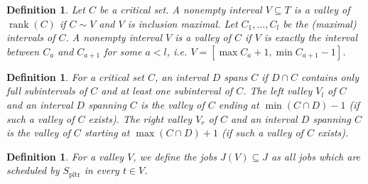 \documentclass[a4paper]{article}
\DeclareMathOperator{\pltr}{pltr}
\DeclareMathOperator{\rank}{rank}
\newtheorem{definition}[theorem]{Definition}
\begin{document}
\begin{definition}
  Let $C$ be a critical set. A nonempty interval $V \subseteq T$ is a \emph{valley of $\rank(C)$} if $C \sim V$ and $V$ is inclusion maximal.
  Let $C_1, \ldots, C_l$ be the (maximal) intervals of $C$.
  A nonempty interval $V$ is a \emph{valley of $C$} if $V$ is exactly the interval between $C_{a}$ and $C_{a+1}$ for some $a < l$, i.e. $V = [\max C_a + 1, \min C_{a+1} - 1]$.
\end{definition}
\begin{definition}
  For a critical set $C$, an interval $D$ \emph{spans} $C$ if $D \cap C$ contains only full subintervals of $C$ and at least one subinterval of $C$.
  The \emph{left valley} $V_l$ of $C$ and an interval $D$ spanning $C$ is the valley of $C$ ending at $\min (C \cap D) - 1$ (if such a valley of $C$ exists).
  The \emph{right valley} $V_r$ of $C$ and an interval $D$ spanning $C$ is the valley of $C$ starting at $\max (C \cap D) + 1$ (if such a valley of $C$ exists).
\end{definition}

\begin{definition}
  For a valley $V$, we define the jobs $J(V) \subseteq J$ as all jobs which are scheduled by $S_{\pltr}$ in every $t \in V$.
\end{definition}
\end{document}
